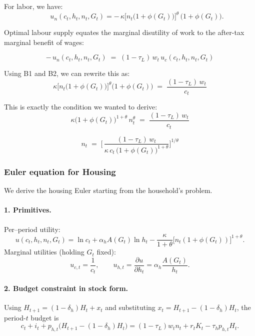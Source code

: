 For labor, we have:
\begin{equation*}
\qquad
u_n(c_t,h_t,n_t,G_t)=-\,\kappa\bigl[n_t\bigl(1+\phi(G_t)\bigr)\bigr]^{\theta}\,\bigl(1+\phi(G_t)\bigr). \tag{B2}
\end{equation*}

Optimal labour supply equates the marginal disutility of work to the after-tax marginal benefit of wages:

\begin{equation*}
-\,u_n(c_t,h_t,n_t,G_t) \;=\;(1-\tau_L)\,w_t\,u_c(c_t,h_t,n_t,G_t) 
\end{equation*}

Using B1 and B2, we can rewrite this as:
\begin{equation*}
\kappa\bigl[n_t\bigl(1+\phi(G_t)\bigr)\bigr]^{\theta}\bigl(1+\phi(G_t)\bigr)
    \;=\;\frac{(1-\tau_L)\,w_t}{c_t}
\end{equation*}

This is exactly the condition we wanted to derive:
\begin{equation*}
\kappa\bigl(1+\phi(G_t)\bigr)^{1+\theta}\,n_t^{\theta}
      \;=\;\frac{(1-\tau_L)\,w_t}{c_t} 
\end{equation*}

\begin{equation*}
        n_t \;=\;\Biggl[\,
        \frac{(1-\tau_L)\,w_t}
            {\kappa\,c_t\,\bigl(1+\phi(G_t)\bigr)^{1+\theta}}
        \Biggr]^{\!1/\theta}\!
\end{equation*}

\subsubsection{Euler equation for Housing}

We derive the housing Euler starting from the household’s problem.

\paragraph{1. Primitives.}
Per–period utility:
\[
u(c_t,h_t,n_t,G_t)=\ln c_t + \alpha_h A(G_t)\ln h_t - \frac{\kappa}{1+\theta}\bigl[n_t(1+\phi(G_t))\bigr]^{1+\theta}.
\]
Marginal utilities (holding $G_t$ fixed):
\[
u_{c,t}=\frac{1}{c_t},\qquad
u_{h,t}=\frac{\partial u}{\partial h_t}=\alpha_h \frac{A(G_t)}{h_t}.
\]

\paragraph{2. Budget constraint in stock form.}
Using $H_{t+1}=(1-\delta_h)H_t + x_t$ and substituting $x_t=H_{t+1}-(1-\delta_h)H_t$, the period-$t$ budget is
\[
c_t + i_t + p_{h,t}\bigl(H_{t+1}-(1-\delta_h)H_t\bigr)
= (1-\tau_L)w_t n_t + r_t K_t - \tau_h p_{h,t} H_t.
\]

